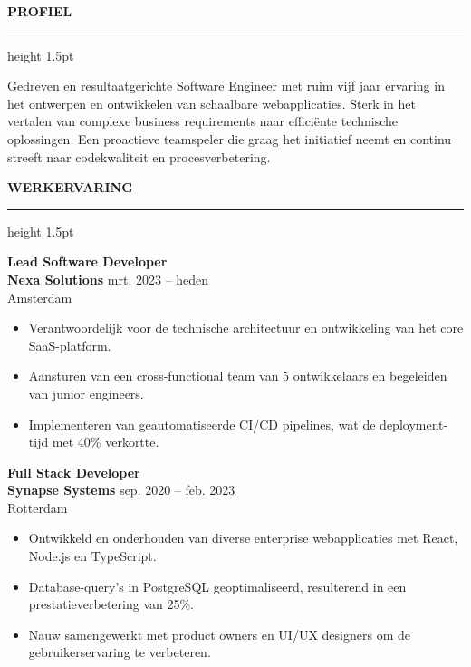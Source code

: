\documentclass[10pt,a4paper]{article}
\newcommand{\cvsection}[1]{%
  \vspace{4mm}%
  {\color{primary}\large\bfseries\MakeUppercase{#1}}%
  \vspace{1.5mm}%
  {\color{accent}\hrule height 1.5pt}%
  \vspace{2.5mm}%
}
\begin{document}
\hfill%
\begin{minipage}[t]{0.66\textwidth}
  \cvsection{Profiel}
  \small
  Gedreven en resultaatgerichte Software Engineer met ruim vijf jaar ervaring in het ontwerpen en ontwikkelen van schaalbare webapplicaties. Sterk in het vertalen van complexe business requirements naar efficiënte technische oplossingen. Een proactieve teamspeler die graag het initiatief neemt en continu streeft naar codekwaliteit en procesverbetering.

  \cvsection{Werkervaring}
  
  \textbf{\large Lead Software Developer} \\
  {\color{accent}\bfseries Nexa Solutions} \hfill {\color{secondary}\footnotesize mrt. 2023 – heden} \\
  {\color{secondary}\footnotesize Amsterdam}
  \begin{itemize}[leftmargin=10pt,topsep=2pt,itemsep=2.5pt,parsep=0pt]
    \item \small Verantwoordelijk voor de technische architectuur en ontwikkeling van het core SaaS-platform.
    \item \small Aansturen van een cross-functional team van 5 ontwikkelaars en begeleiden van junior engineers.
    \item \small Implementeren van geautomatiseerde CI/CD pipelines, wat de deployment-tijd met 40\% verkortte.
  \end{itemize}
  
  \vspace{3.5mm}
  
  \textbf{\large Full Stack Developer} \\
  {\color{accent}\bfseries Synapse Systems} \hfill {\color{secondary}\footnotesize sep. 2020 – feb. 2023} \\
  {\color{secondary}\footnotesize Rotterdam}
  \begin{itemize}[leftmargin=10pt,topsep=2pt,itemsep=2.5pt,parsep=0pt]
    \item \small Ontwikkeld en onderhouden van diverse enterprise webapplicaties met React, Node.js en TypeScript.
    \item \small Database-query's in PostgreSQL geoptimaliseerd, resulterend in een prestatieverbetering van 25\%.
    \item \small Nauw samengewerkt met product owners en UI/UX designers om de gebruikerservaring te verbeteren.
  \end{itemize}
  
  \vspace{3.5mm}
  

\end{minipage}
\end{document}
